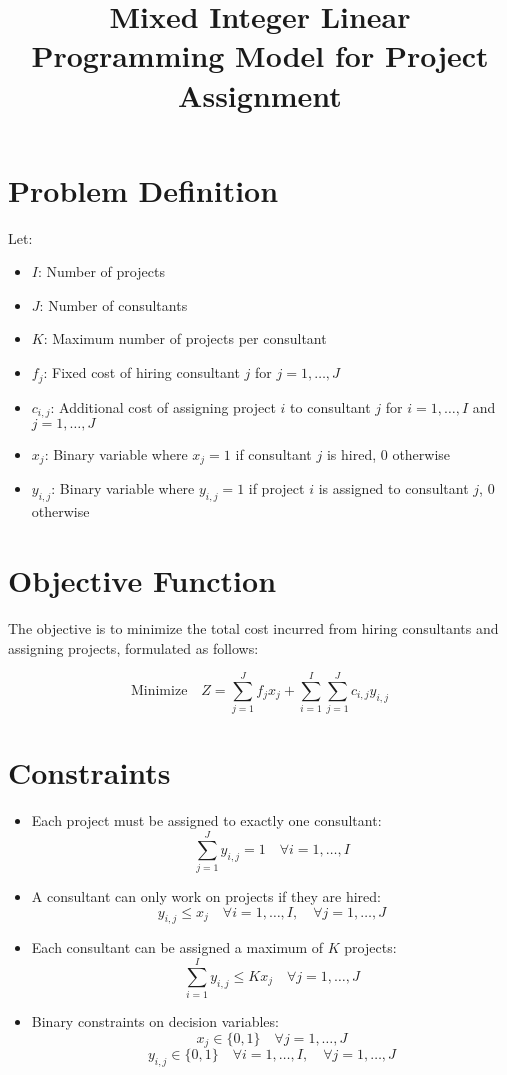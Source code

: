 \documentclass{article}
\begin{document}
\title{Mixed Integer Linear Programming Model for Project Assignment}
\author{}
\date{}
\maketitle

\section*{Problem Definition}

Let:
\begin{itemize}
    \item $I$: Number of projects
    \item $J$: Number of consultants
    \item $K$: Maximum number of projects per consultant
    \item $f_j$: Fixed cost of hiring consultant $j$ for $j = 1, \ldots, J$
    \item $c_{i,j}$: Additional cost of assigning project $i$ to consultant $j$ for $i = 1, \ldots, I$ and $j = 1, \ldots, J$
    \item $x_{j}$: Binary variable where $x_{j} = 1$ if consultant $j$ is hired, $0$ otherwise
    \item $y_{i,j}$: Binary variable where $y_{i,j} = 1$ if project $i$ is assigned to consultant $j$, $0$ otherwise
\end{itemize}

\section*{Objective Function}

The objective is to minimize the total cost incurred from hiring consultants and assigning projects, formulated as follows:

\[
\text{Minimize} \quad Z = \sum_{j=1}^{J} f_j x_j + \sum_{i=1}^{I} \sum_{j=1}^{J} c_{i,j} y_{i,j}
\]

\section*{Constraints}

\begin{itemize}
    \item Each project must be assigned to exactly one consultant:
    \[
    \sum_{j=1}^{J} y_{i,j} = 1 \quad \forall i = 1, \ldots, I
    \]
    
    \item A consultant can only work on projects if they are hired:
    \[
    y_{i,j} \leq x_j \quad \forall i = 1, \ldots, I, \quad \forall j = 1, \ldots, J
    \]

    \item Each consultant can be assigned a maximum of $K$ projects:
    \[
    \sum_{i=1}^{I} y_{i,j} \leq K x_j \quad \forall j = 1, \ldots, J
    \]

    \item Binary constraints on decision variables:
    \[
    x_j \in \{0, 1\} \quad \forall j = 1, \ldots, J
    \]
    \[
    y_{i,j} \in \{0, 1\} \quad \forall i = 1, \ldots, I, \quad \forall j = 1, \ldots, J
    \]
\end{itemize}
\end{document}
